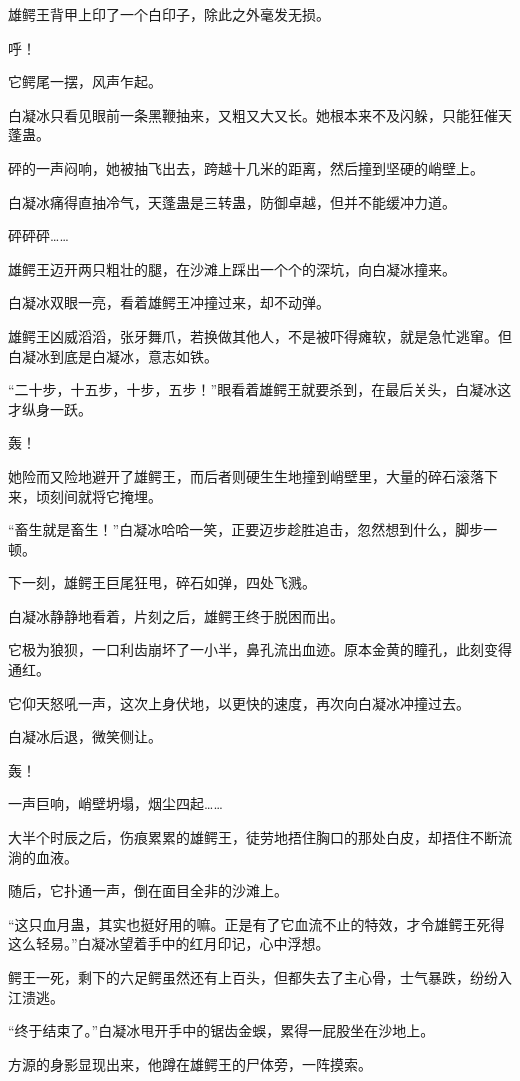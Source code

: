 \begin{this_body}
雄鳄王背甲上印了一个白印子，除此之外毫发无损。

呼！

它鳄尾一摆，风声乍起。

白凝冰只看见眼前一条黑鞭抽来，又粗又大又长。她根本来不及闪躲，只能狂催天蓬蛊。

砰的一声闷响，她被抽飞出去，跨越十几米的距离，然后撞到坚硬的峭壁上。

白凝冰痛得直抽冷气，天蓬蛊是三转蛊，防御卓越，但并不能缓冲力道。

砰砰砰……

雄鳄王迈开两只粗壮的腿，在沙滩上踩出一个个的深坑，向白凝冰撞来。

白凝冰双眼一亮，看着雄鳄王冲撞过来，却不动弹。

雄鳄王凶威滔滔，张牙舞爪，若换做其他人，不是被吓得瘫软，就是急忙逃窜。但白凝冰到底是白凝冰，意志如铁。

“二十步，十五步，十步，五步！”眼看着雄鳄王就要杀到，在最后关头，白凝冰这才纵身一跃。

轰！

她险而又险地避开了雄鳄王，而后者则硬生生地撞到峭壁里，大量的碎石滚落下来，顷刻间就将它掩埋。

“畜生就是畜生！”白凝冰哈哈一笑，正要迈步趁胜追击，忽然想到什么，脚步一顿。

下一刻，雄鳄王巨尾狂甩，碎石如弹，四处飞溅。

白凝冰静静地看着，片刻之后，雄鳄王终于脱困而出。

它极为狼狈，一口利齿崩坏了一小半，鼻孔流出血迹。原本金黄的瞳孔，此刻变得通红。

它仰天怒吼一声，这次上身伏地，以更快的速度，再次向白凝冰冲撞过去。

白凝冰后退，微笑侧让。

轰！

一声巨响，峭壁坍塌，烟尘四起……

大半个时辰之后，伤痕累累的雄鳄王，徒劳地捂住胸口的那处白皮，却捂住不断流淌的血液。

随后，它扑通一声，倒在面目全非的沙滩上。

“这只血月蛊，其实也挺好用的嘛。正是有了它血流不止的特效，才令雄鳄王死得这么轻易。”白凝冰望着手中的红月印记，心中浮想。

鳄王一死，剩下的六足鳄虽然还有上百头，但都失去了主心骨，士气暴跌，纷纷入江溃逃。

“终于结束了。”白凝冰甩开手中的锯齿金蜈，累得一屁股坐在沙地上。

方源的身影显现出来，他蹲在雄鳄王的尸体旁，一阵摸索。


\end{this_body}
